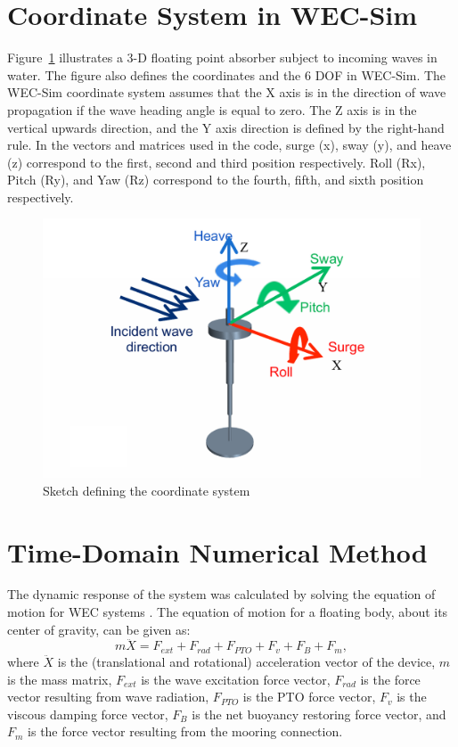 \section{\noindent Coordinate System in WEC-Sim}
Figure~\ref{fig:coordinate system} illustrates a 3-D floating point absorber subject to incoming waves in water. The figure also defines the coordinates and the 6 DOF in WEC-Sim. The WEC-Sim coordinate system  assumes that the  X axis is in the direction of wave propagation if the wave heading angle is equal to zero. The Z axis is in the vertical upwards direction, and the Y axis direction is defined by the right-hand rule. In the vectors and matrices used in the code, surge (x), sway (y), and heave (z) correspond to the first, second and third position respectively. Roll (Rx), Pitch (Ry), and Yaw (Rz) correspond to the fourth, fifth, and sixth position respectively.

\begin{figure}[H]
\begin{centering}
\includegraphics[scale=0.8]{theoryManual/Figures/coordinateSystem}
\end{centering}
\noindent \centering{}\protect\caption{Sketch defining the coordinate system\label{fig:coordinate system}}
\end{figure}

\section{\noindent Time-Domain Numerical Method}
\noindent The dynamic response of the system was calculated by solving
the equation of motion for WEC systems \cite{Babarit2012b,Nolte2014}. The equation of motion
for a floating body, about its center of gravity, can be given as:
\begin{equation}
m\ddot{X}=F_{ext}+F_{rad}+F_{PTO}+F_{v}+F_{B}+F_{m},
\end{equation}
where $\ddot{X}$ is the (translational and rotational) acceleration vector
of the device, $m$ is the mass matrix, $F_{ext}$ is the wave excitation
force vector, $F_{rad}$ is the force vector resulting from wave radiation,
$F_{PTO}$ is the PTO force vector, $F_{v}$ is the viscous damping
force vector, $F_{B}$ is the net buoyancy restoring force vector,
and $F_{m}$ is the force vector resulting from the mooring connection. 

